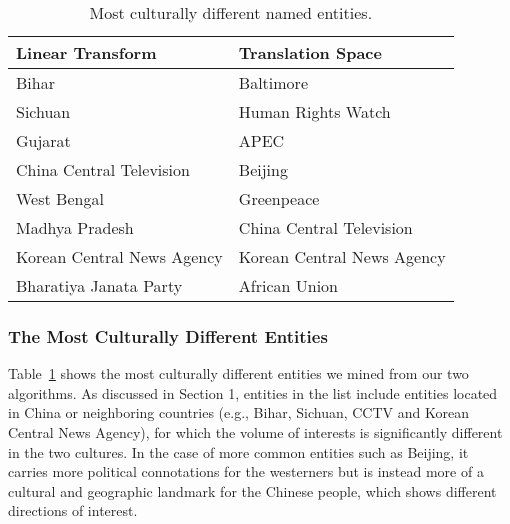 \begin{table}[h!]
	\small
	\centering
	\caption{Most culturally different named entities.}
	\label{tbl:list}
	\begin{tabular}{l|l}
		\textbf{Linear Transform} & \textbf{Translation Space} \\ \hline
		Bihar & Baltimore \\ \hline
		Sichuan & Human Rights Watch \\ \hline
		Gujarat & APEC \\ \hline
		China Central Television & Beijing\\ \hline
		West Bengal & Greenpeace \\ \hline
		Madhya Pradesh & China Central Television\\ \hline
		Korean Central News Agency & Korean Central News Agency\\ \hline
		Bharatiya Janata Party & African Union
		
		
	\end{tabular}
\end{table}

\subsubsection{The Most Culturally Different Entities}

Table~\ref{tbl:list} shows the most culturally different entities we mined from
our two algorithms. As discussed in Section 1, entities in the list include
entities located in China or neighboring countries (e.g., Bihar, Sichuan,
CCTV and Korean Central News Agency), for which the volume of interests is
significantly different in the two cultures. In the case of more common
entities such as Beijing, it carries more political connotations for
the westerners but is instead more of a cultural and geographic landmark
for the Chinese people, which shows different directions of interest.



